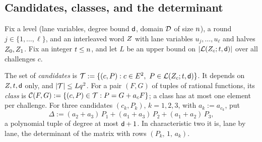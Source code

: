 \subsection{Candidates, classes, and the determinant}\label{sec:L1}

Fix a level (lane variables, degree bound $\mathsf{d}$, domain $\mathcal{D}$ of size $n$), a round $j\in\{1,\dots,\ell\}$, and an interleaved word $Z$ with lane variables $u_j,\dots,u_\ell$ and halves $Z_0,Z_1$. Fix an integer $t\le n$, and let $L$ be an upper bound on $|\mathcal{L}(Z_c;t,\mathsf{d})|$ over all challenges $c$.

\begin{definition}\label{def:cand}
The set of \emph{candidates} is $\cand:=\{(c,P):c\in\E^2,\ P\in\lst(\orc_c;\agr,\dgr)\}$. It depends on $Z,t,\mathsf{d}$ only, and $|\mathcal{T}|\le Lq^2$. For a pair $(F,G)$ of tuples of rational functions, its \emph{class} is $\mathcal{C}(F,G):=\{(c,P)\in\mathcal{T}:P=G+a_cF\}$; a class has at most one element per challenge. For three candidates $(c_k,P_k)$, $k=1,2,3$, with $a_k:=a_{c_k}$, put
\[
\Delta:=(a_2+a_3)\,P_1+(a_1+a_3)\,P_2+(a_1+a_2)\,P_3,
\]
a polynomial tuple of degree at most $\mathsf{d}+1$. In characteristic two it is, lane by lane, the determinant of the matrix with rows $(P_k,\,1,\,a_k)$.
\end{definition}

